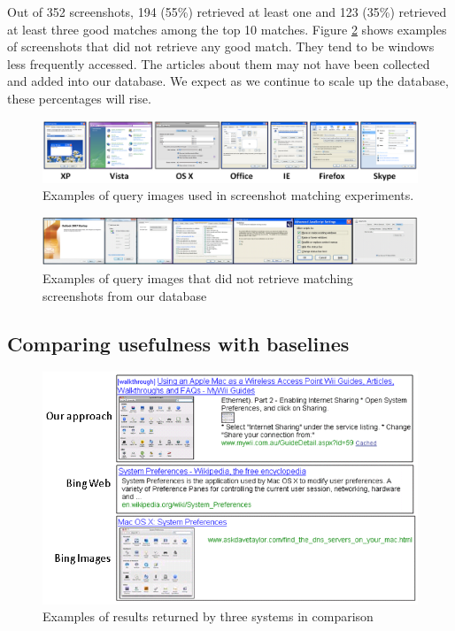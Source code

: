 \documentclass{www2010-submission}
\begin{document}
Out of 352 screenshots, 194 (55\%) retrieved at least one and 123
(35\%) retrieved at least three good matches among the top 10
matches. Figure \ref{fig:hard_examples} shows examples of screenshots
that did not retrieve any good match. They tend to be windows less
frequently accessed. The articles about them may not have been
collected and added into our database.  We expect as we continue to
scale up the database, these percentages will rise.

\begin{figure}
\includegraphics[width=2\columnwidth]{figure/query_examples.png}
\caption{Examples of query images used in screenshot matching
experiments.}
\label{fig:query_examples}
\end{figure}

\begin{figure}
\includegraphics[width=2\columnwidth]{figure/hard_examples.png}
\caption{Examples of query images that did not retrieve matching 
screenshots from our database}
\label{fig:hard_examples}
\end{figure}

\subsection{Comparing usefulness with baselines}

\begin{figure}
\includegraphics[width=1\columnwidth]{figure/comparison_example.png}
\caption{Examples of results returned by three systems in comparison}
\label{fig:comparison_example}
\end{figure}
\end{document}
